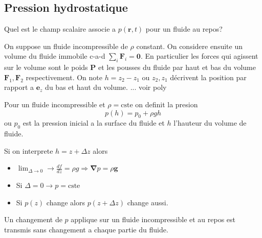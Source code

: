 \subsection{Pression hydrostatique}
\begin{question}
Quel est le champ scalaire associe a $p(\boldsymbol{r},t)$ pour un fluide au repos?
\end{question}
\begin{answer}
On suppose un fluide incompressible de $\rho$ constant. On considere ensuite un volume du fluide immobile c-a-d $\sum _{i}\boldsymbol{F}_{i}=\boldsymbol{0}$. En particulier les forces qui agissent sur le volume sont le poids $\boldsymbol{P}$ et les pousses du fluide par haut et bas du volume $\boldsymbol{F}_{1},\boldsymbol{F}_{2}$ respectivement. On note $h=z_{2}-z_{1}$ ou $z_{2},z_{1}$ décrivent la position par rapport a $\boldsymbol{e}_{z}$ du bas et haut du volume. ... voir poly
\end{answer}
\begin{theorem}
Pour un fluide incompressible et $\rho=\mathrm{cste}$ on definit la presion
$$
p(h)=p_{0}+\rho gh
$$
ou $p_{0}$ est la pression inicial a la surface du fluide et $h$ l'hauteur du volume de fluide.
\end{theorem}
\begin{remark}
Si on interprete $h=z+\Delta z$ alors
\begin{itemize}
\item $\lim_{ \Delta \to 0 }\to \frac{df}{dz}=\rho g\Rightarrow \boldsymbol{\nabla}p=\rho \boldsymbol{g}$
\item Si $\Delta=0\to p=\mathrm{cste}$ 
\item Si $p(z)$ change alors $p(z+\Delta z)$ change aussi.
\end{itemize}
\end{remark}

\begin{proposition}
Un changement de $p$ applique sur un fluide incompressible et au repos est transmis sans changement a chaque partie du fluide.
\end{proposition}
